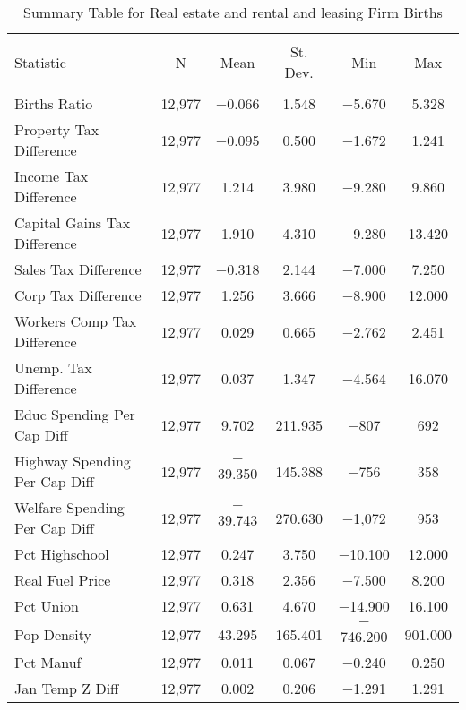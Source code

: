 
\begin{table}[!htbp] \centering 
  \caption{Summary Table for  Real estate and rental and leasing Firm Births} 
  \label{53summary} 
\begin{tabular}{@{\extracolsep{5pt}}lccccc} 
\\[-1.8ex]\hline 
\hline \\[-1.8ex] 
Statistic & \multicolumn{1}{c}{N} & \multicolumn{1}{c}{Mean} & \multicolumn{1}{c}{St. Dev.} & \multicolumn{1}{c}{Min} & \multicolumn{1}{c}{Max} \\ 
\hline \\[-1.8ex] 
Births Ratio & 12,977 & $-$0.066 & 1.548 & $-$5.670 & 5.328 \\ 
Property Tax Difference & 12,977 & $-$0.095 & 0.500 & $-$1.672 & 1.241 \\ 
Income Tax Difference & 12,977 & 1.214 & 3.980 & $-$9.280 & 9.860 \\ 
Capital Gains Tax Difference & 12,977 & 1.910 & 4.310 & $-$9.280 & 13.420 \\ 
Sales Tax Difference & 12,977 & $-$0.318 & 2.144 & $-$7.000 & 7.250 \\ 
Corp Tax Difference & 12,977 & 1.256 & 3.666 & $-$8.900 & 12.000 \\ 
Workers Comp Tax Difference & 12,977 & 0.029 & 0.665 & $-$2.762 & 2.451 \\ 
Unemp. Tax Difference & 12,977 & 0.037 & 1.347 & $-$4.564 & 16.070 \\ 
Educ Spending Per Cap Diff & 12,977 & 9.702 & 211.935 & $-$807 & 692 \\ 
Highway Spending Per Cap Diff & 12,977 & $-$39.350 & 145.388 & $-$756 & 358 \\ 
Welfare Spending Per Cap Diff & 12,977 & $-$39.743 & 270.630 & $-$1,072 & 953 \\ 
Pct Highschool & 12,977 & 0.247 & 3.750 & $-$10.100 & 12.000 \\ 
Real Fuel Price & 12,977 & 0.318 & 2.356 & $-$7.500 & 8.200 \\ 
Pct Union & 12,977 & 0.631 & 4.670 & $-$14.900 & 16.100 \\ 
Pop Density & 12,977 & 43.295 & 165.401 & $-$746.200 & 901.000 \\ 
Pct Manuf & 12,977 & 0.011 & 0.067 & $-$0.240 & 0.250 \\ 
Jan Temp Z Diff & 12,977 & 0.002 & 0.206 & $-$1.291 & 1.291 \\ 

\end{tabular}
\end{table}

